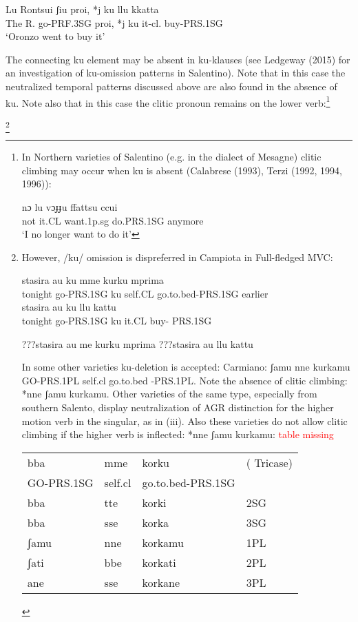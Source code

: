 \documentclass[output=paper,colorlinks,citecolor=brown,
]{langscibook}
\begin{document}
\ea \gll Lu Rontsui   ʃiu        proi, *j  ku  llu    kkatta\\
  The R.     go-PRF.3SG  proi, *j  ku  it-cl.  buy-PRS.1SG  \\
  \glt ‘Oronzo went to buy it’
\z

The connecting ku element may be absent in ku-klauses (see Ledgeway (2015) for an investigation of ku-omission patterns in Salentino).  Note that in this case the neutralized temporal patterns discussed above are also found in the absence of ku. Note also that in this case the clitic pronoun remains on the lower verb:\footnote{In Northern varieties of Salentino (e.g. in the dialect of Mesagne) clitic climbing may occur when ku is absent (Calabrese (1993), Terzi (1992, 1994, 1996)):

\ea \gll nɔ  lu  vɔɟɟu  ffattsu   ccui    \\ 
 not it.CL  want.1p.sg  do.PRS.1SG  anymore\\
 \glt `I no longer want to do it’
\z 

}

\footnote{However, /ku/ omission is dispreferred in Campiota in Full-fledged MVC:

\ea
    \ea \gll stasira au      ku  mme    kurku       mprima\\
     tonight go-PRS.1SG  ku self.CL  go.to.bed-PRS.1SG  earlier\\
    \ex \gll stasira  au       ku  llu   kattu\\
   tonight  go-PRS.1SG  ku  it.CL buy- PRS.1SG \\
    \z
\z

\ea
    \ea ???stasira au me kurku mprima
    \ex ???stasira au llu kattu 
    \z
\z
  
In some other varieties ku-deletion is accepted:  Carmiano: ʃamu nne kurkamu GO-PRS.1PL self.cl   go.to.bed -PRS.1PL. Note the absence of clitic climbing:  *nne ʃamu kurkamu.  Other varieties of the same type, especially from southern Salento, display neutralization of AGR distinction for the higher motion verb in the singular, as in (iii).  Also these varieties do not allow clitic climbing if the higher verb is inflected: *nne ʃamu kurkamu:   \textcolor{red}{table missing}

\ea
\begin{table}[htb!] \small
\begin{tabular}{llll}
bba        & mme     & korku             & ( Tricase) \\
GO-PRS.1SG & self.cl & go.to.bed-PRS.1SG &            \\
bba        & tte     & korki             & 2SG        \\
bba        & sse     & korka             & 3SG        \\
ʃamu       & nne     & korkamu           & 1PL        \\
ʃati       & bbe     & korkati           & 2PL        \\
ane        & sse     & korkane           & 3PL       
\end{tabular}
\end{table}
\z

}
\end{document}
